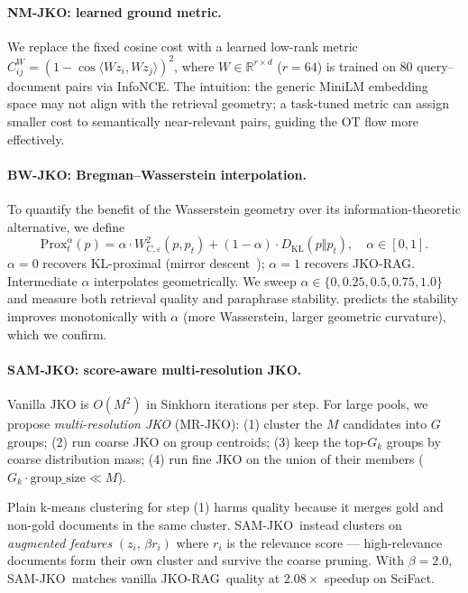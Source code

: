 \documentclass{article}
\theoremstyle{plain}
\newcommand{\Wdist}{W_{\!C,\varepsilon}}
\newcommand{\jko}{\textsc{JKO-RAG}}
\newcommand{\bwjko}{\textsc{BW-JKO}}
\newcommand{\nmjko}{\textsc{NM-JKO}}
\newcommand{\samjko}{\textsc{SAM-JKO}}
\begin{document}
\paragraph{\nmjko: learned ground metric.}
We replace the fixed cosine cost with a learned low-rank metric $C^W_{ij}=(1-\cos\langle Wz_i, Wz_j\rangle)^2$, where $W\in\mathbb{R}^{r\times d}$ ($r{=}64$) is trained on 80 query--document pairs via InfoNCE. The intuition: the generic MiniLM embedding space may not align with the retrieval geometry; a task-tuned metric can assign smaller cost to semantically near-relevant pairs, guiding the OT flow more effectively.

\paragraph{\bwjko: Bregman--Wasserstein interpolation.}
To quantify the benefit of the Wasserstein geometry over its information-theoretic alternative, we define
\begin{equation}
  \mathrm{Prox}_t^\alpha(p) = \alpha\cdot\Wdist^2(p,p_t) + (1-\alpha)\cdot D_{\mathrm{KL}}(p\Vert p_t), \quad \alpha\in[0,1].
\label{eq:bwjko}
\end{equation}
$\alpha{=}0$ recovers KL-proximal (mirror descent~\cite{beck2003mirror}); $\alpha{=}1$ recovers \jko. Intermediate $\alpha$ interpolates geometrically. We sweep $\alpha\in\{0, 0.25, 0.5, 0.75, 1.0\}$ and measure both retrieval quality and paraphrase stability.  predicts the stability improves monotonically with $\alpha$ (more Wasserstein, larger geometric curvature), which we confirm.

\paragraph{\samjko: score-aware multi-resolution JKO.}
Vanilla JKO is $O(M^2)$ in Sinkhorn iterations per step. For large pools, we propose \emph{multi-resolution JKO} (MR-JKO): (1) cluster the $M$ candidates into $G$ groups; (2) run coarse JKO on group centroids; (3) keep the top-$G_k$ groups by coarse distribution mass; (4) run fine JKO on the union of their members ($G_k\cdot\text{group\_size} \ll M$).

Plain k-means clustering for step (1) harms quality because it merges gold and non-gold documents in the same cluster. \samjko\ instead clusters on \emph{augmented features} $(z_i,\,\beta r_i)$ where $r_i$ is the relevance score --- high-relevance documents form their own cluster and survive the coarse pruning. With $\beta{=}2.0$, \samjko\ matches vanilla \jko\ quality at $2.08\times$ speedup on SciFact.
\end{document}
